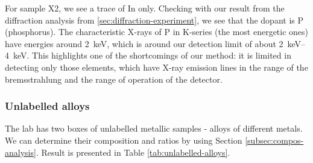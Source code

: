 \documentclass[11pt,a4paper,twoside,onecolumn]{article}
\begin{document}
For sample X2, we see a trace of In only. Checking with our result from the diffraction analysis from \ref{sec:diffraction-experiment}, we see that the dopant is P (phosphorus). The characteristic X-rays of P in K-series (the most energetic ones) have energies around \qty{2}{keV}, which is around our detection limit of about \qtyrange{2}{4}{keV}. This highlights one of the shortcomings of our method: it is limited in detecting only those elements, which have X-ray emission lines in the range of the bremsstrahlung and the range of operation of the detector.

\subsubsection{Unlabelled alloys}\label{subsubsec:unlabelled-alloys}
The lab has two boxes of unlabelled metallic samples - alloys of different metals. We can determine their composition and ratios by using Section \ref{subsec:compos-analysis}. Result is presented in Table \ref{tab:unlabelled-alloys}.
\end{document}
